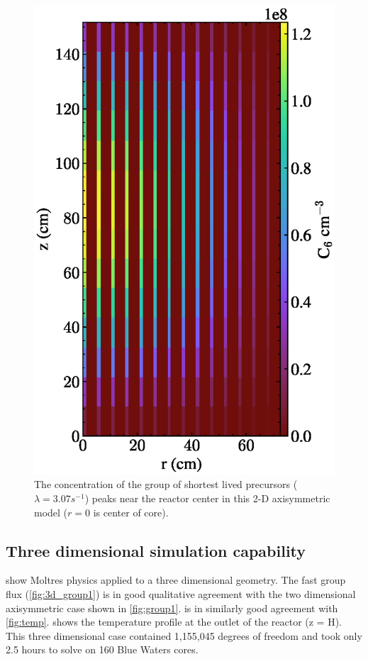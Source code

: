 \documentclass{article}
\let\Oldsubsection\subsection
\renewcommand{\subsection}{\FloatBarrier\Oldsubsection}
\begin{document}
\begin{figure}[htpb]
  \centering
  \includegraphics{2d_gamma_heating_pre6_scaled.eps}
        \caption{The concentration of the group of shortest lived precursors
        ($\lambda = 3.07 s^{-1}$) peaks near the reactor center
        in this 2-D axisymmetric model ($r=0$ is center of core).}
  \label{fig:pre6}
\end{figure}

\subsection{Three dimensional simulation capability}

 show Moltres physics applied to a three
dimensional geometry. The fast group flux (\cref{fig:3d_group1}) is in good
qualitative agreement with the two dimensional axisymmetric case shown in
\cref{fig:group1}.  is in similarly good agreement with
\cref{fig:temp}.  shows the temperature profile at
the outlet of the reactor (z = H). This three dimensional case contained
1,155,045 degrees of freedom and took only 2.5 hours to solve on 160 Blue Waters
cores.
\end{document}

